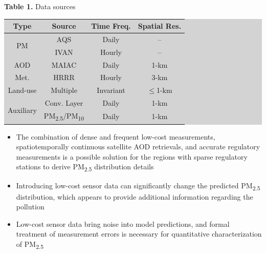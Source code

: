 \documentclass[a0paper,portrait]{baposter}
\newcommand{\tsub}{\textsubscript}
\begin{document}
\begin{poster}
{\begin{center}
    \textbf{Table 1.} Data sources\\
{\renewcommand{\arraystretch}{0.7}%
\begin{threeparttable}
\footnotesize
\begingroup\setlength{\fboxsep}{0pt}
\colorbox{lightgray}{%
\begin{tabular}{cccc}
\toprule
\textbf{Type}              & \textbf{Source} & \textbf{Time Freq.} & \textbf{Spatial Res.} \\ \midrule
\multirow{2}{*}{PM}     & AQS             & Daily               & --                    \\
                           & IVAN            & Hourly              & --                    \\ \midrule
AOD                        & MAIAC           & Daily               & 1-km                  \\ \midrule
Met.                       & HRRR            & Hourly              & 3-km                  \\ \midrule
Land-use                   & Multiple        & Invariant           & $\leq$1-km        \\ \midrule
\multirow{2}{*}{Auxiliary} & Conv. Layer     & Daily               & 1-km                  \\
                           & PM\tsub{2.5}/PM\tsub{10}      & Daily               & 1-km                  \\ \bottomrule
\end{tabular}
}\endgroup
\end{threeparttable}
}
\end{center}

}

{

\begin{itemize}
    \item The combination of dense and frequent low-cost measurements, spatiotemporally continuous satellite AOD retrievals, and accurate regulatory measurements is a possible solution for the regions with sparse regulatory stations to derive PM\tsub{2.5} distribution details
    \item Introducing low-cost sensor data can significantly change the predicted PM\tsub{2.5} distribution, which appears to provide additional information regarding the pollution
    \item Low-cost sensor data bring noise into model predictions, and formal treatment of measurement errors is necessary for quantitative characterization of PM\tsub{2.5}
\end{itemize}

}
\end{poster}
\end{document}
